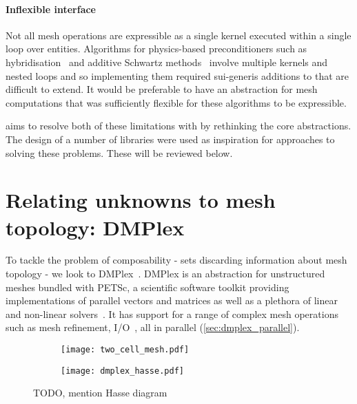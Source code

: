 \documentclass[thesis]{subfiles}
\begin{document}
\paragraph{Inflexible interface}{
  Not all mesh operations are expressible as a single kernel executed within a single loop over entities.
  Algorithms for physics-based preconditioners such as hybridisation~\cite{gibsonSlateExtendingFiredrake2020} and additive Schwartz methods~\cite{farrellPCPATCHSoftwareTopological2021} involve multiple kernels and nested loops and so implementing them required sui-generis additions to  that are difficult to extend.
  It would be preferable to have an abstraction for mesh computations that was sufficiently flexible for these algorithms to be expressible.
}

 aims to resolve both of these limitations with  by rethinking the core abstractions.
The design of a number of libraries were used as inspiration for approaches to solving these problems.
These will be reviewed below.

\section{Relating unknowns to mesh topology: DMPlex}

To tackle the problem of composability - sets discarding information about mesh topology - we look to DMPlex~\cite{knepleyMeshAlgorithmsPDE2009,langeEfficientMeshManagement2016,knepleyUnstructuredOverlappingMesh2015}.
DMPlex is an abstraction for unstructured meshes bundled with PETSc, a scientific software toolkit providing implementations of parallel vectors and matrices as well as a plethora of linear and non-linear solvers~\cite{petsc-web-page,petsc-user-ref,petsc-efficient}.
It has support for a range of complex mesh operations such as mesh refinement, I/O~\cite{hamEfficientNtoMCheckpointing2024}, all in parallel (\cref{sec:dmplex_parallel}).  %

\begin{figure}
  \centering
  \begin{subfigure}{.49\textwidth}
    \centering
    \texttt{[image: two\_cell\_mesh.pdf]}
  \end{subfigure}
  \begin{subfigure}{.49\textwidth}
    \centering
    \texttt{[image: dmplex\_hasse.pdf]}
  \end{subfigure}
  \caption{TODO, mention Hasse diagram}
  \label{fig:dmplex_hasse}
\end{figure}
\end{document}
